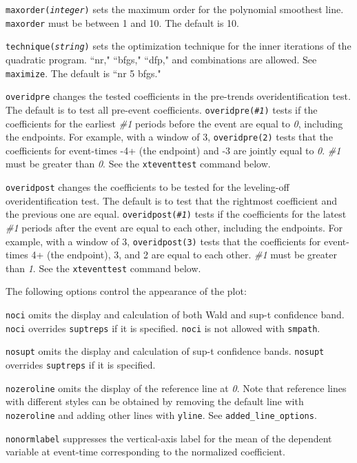 \documentclass[12pt]{article}
\begin{document}
\morehangpara
\texttt{maxorder({\it integer})} sets the maximum order for the polynomial smoothest line.
\texttt{maxorder} must be between 1 and 10. The default is 10.

\morehangpara
\texttt{technique({\it string})} sets the optimization technique for the inner iterations of the quadratic program. ``nr," ``bfgs," ``dfp," and combinations are allowed. See {\tt maximize}. The default is ``nr 5 bfgs."

\hangpara
\texttt{overidpre} changes the tested coefficients in the pre-trends overidentification test.
The default is to test all pre-event coefficients.
\texttt{overidpre({\it \#1})} tests if the coefficients for the earliest {\it \#1} periods before the event are equal to {\it 0}, including the endpoints.
For example, with a window of 3, \texttt{overidpre(2)} tests that the coefficients for event-times -4+ (the endpoint) and -3 are jointly equal to {\it 0}.
{\it \#1} must be greater than {\it 0}.
See the \texttt{xteventtest} command below.

\hangpara
\texttt{overidpost} changes the coefficients to be tested for the leveling-off overidentification test.
The default is to test that the rightmost coefficient and the previous one are equal.
\texttt{overidpost({\it \#1})} tests if the coefficients for the latest {\it \#1} periods after the event are equal to each other, including the endpoints.
For example, with a window of 3, \texttt{overidpost(3)} tests that the coefficients for event-times 4+ (the endpoint), 3, and 2 are equal to each other.
{\it \#1} must be greater than {\it 1}.
See the \texttt{xteventtest} command below.

\hangpara
The following options control the appearance of the plot:

\hangpara
\texttt{noci} omits the display and calculation of both Wald and sup-t confidence band. \texttt{noci} overrides \texttt{suptreps} if it is specified.  \texttt{noci} is not allowed with \texttt{smpath}.

\hangpara
\texttt{nosupt} omits the display and calculation of sup-t confidence bands. \texttt{nosupt} overrides \texttt{suptreps} if it is specified.

\hangpara
\texttt{nozeroline} omits the display of the reference line at {\it 0}. Note that reference lines with different styles can be obtained by removing the default line with \texttt{nozeroline} and adding other lines with \texttt{yline}. See \texttt{added\_line\_options}.

\hangpara
\texttt{nonormlabel} suppresses the vertical-axis label for the mean of the dependent variable at event-time corresponding to the normalized coefficient.
\end{document}
